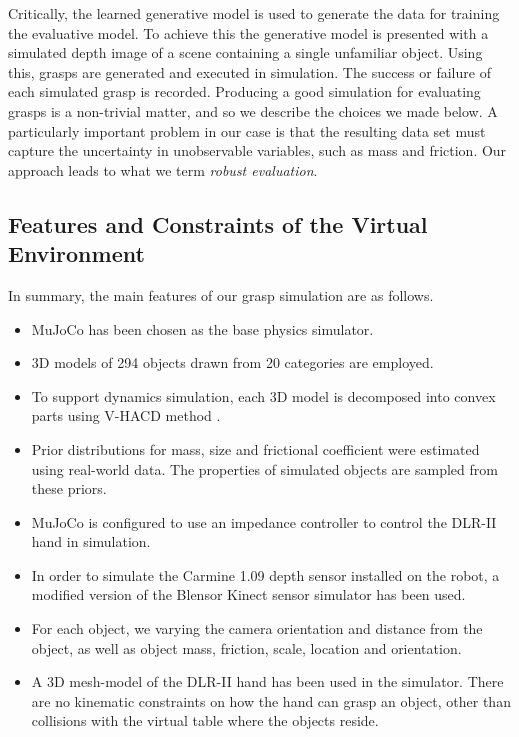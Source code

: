 
Critically, the learned generative model is used to generate the data for training the evaluative model. To achieve this the generative model is presented with a simulated depth image of a scene containing a single unfamiliar object. Using this, grasps are generated and executed in simulation. The success or failure of each simulated grasp is recorded. Producing a good simulation for evaluating grasps is a non-trivial matter, and so we describe the choices we made below. A particularly important problem in our case is that the resulting data set must capture the uncertainty in unobservable variables, such as mass and friction. Our approach leads to what we term {\em robust evaluation}.

\subsection{Features and Constraints of the Virtual Environment}
\label{subsection:environment}
In summary, the main features of our grasp simulation are as follows.
\begin{itemize}
\item MuJoCo \cite{MuJoCo} has been chosen as the base physics simulator. 
\item 3D models of 294 objects drawn from 20 categories are employed.
\item To support dynamics simulation, each 3D model is decomposed into convex parts using V-HACD method \cite{V-HACD}.
\item Prior distributions for mass, size and frictional coefficient were estimated using real-world data. The properties of simulated objects are sampled from these priors.
\item MuJoCo is configured to use an impedance controller to control the DLR-II hand in simulation.
\item In order to simulate the Carmine 1.09 depth sensor installed on the robot, a modified version of the Blensor Kinect sensor simulator \cite{KinectSimulator} has been used. 
\item For each object, we varying the camera orientation and distance from the object, as well as object mass, friction, scale, location and orientation. 
\item A 3D mesh-model of the DLR-II hand has been used in the simulator. There are no kinematic constraints on how the hand can grasp an object, other than collisions with the virtual table where the objects reside. 
\end{itemize}


